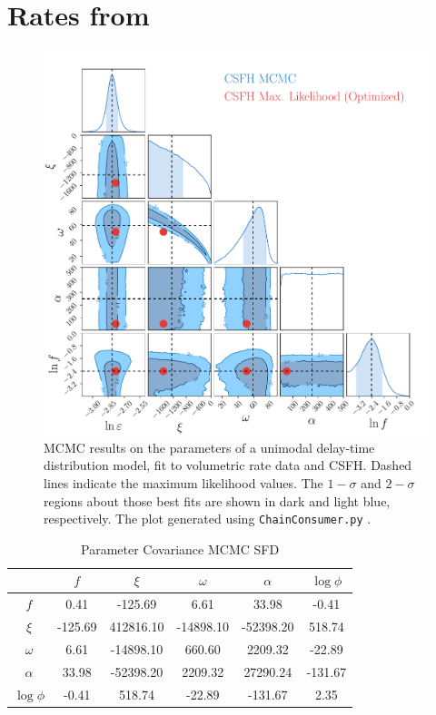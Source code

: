 \documentclass[apj]{aastex62}
\begin{document}
\appendix
\section{Rates from}


\begin{figure}[t] %
   \centering
   \includegraphics[width=6.5in]{figure_sfd_corners} 
   \caption{\footnotesize MCMC results on the parameters of a unimodal delay-time distribution model, fit to volumetric rate data and CSFH. Dashed lines indicate the maximum likelihood values. The $1-\sigma$ and $2-\sigma$ regions about those best fits are shown in dark and light blue, respectively. The plot generated using {\tt ChainConsumer.py} \citep{Hinton:2016qy}.}
   \label{fig:mcmc_sfd}
\end{figure}
\clearpage

\begin{table}
    \centering
    \caption{Parameter Covariance MCMC SFD}
    \label{tab:parameter_covariance1}
    \begin{tabular}{c|ccccc}
         & $f$ & $\xi$ & $\omega$ & $\alpha$ & $\log \phi$\\ 
        \hline
              $f$ &  0.41 & -125.69 &  6.61 & 33.98 & -0.41 \\ 
            $\xi$ & -125.69 & 412816.10 & -14898.10 & -52398.20 & 518.74 \\ 
         $\omega$ &  6.61 & -14898.10 & 660.60 & 2209.32 & -22.89 \\ 
         $\alpha$ & 33.98 & -52398.20 & 2209.32 & 27290.24 & -131.67 \\ 
        $\log \phi$ & -0.41 & 518.74 & -22.89 & -131.67 &  2.35 \\ 
        \hline
    \end{tabular}
\end{table}
\end{document}
